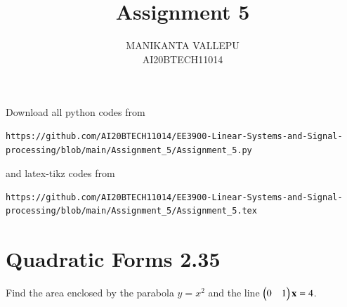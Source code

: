\documentclass[journal,12pt,twocolumn]{IEEEtran}
\begin{document}
     \def\centbox#1{\makebox[0in]{#1}}
     \def\topbox#1{\raisebox{-\baselineskip}[0in][0in]{#1}}
     \def\midbox#1{\raisebox{-0.5\baselineskip}[0in][0in]{#1}}
\vspace{3cm}
\title{Assignment 5}
\author{MANIKANTA VALLEPU \\ AI20BTECH11014}
\maketitle
\newpage
\bigskip
\renewcommand{\thefigure}{\theenumi}
\renewcommand{\thetable}{\theenumi}
Download all python codes from 
\begin{lstlisting}
https://github.com/AI20BTECH11014/EE3900-Linear-Systems-and-Signal-processing/blob/main/Assignment_5/Assignment_5.py
\end{lstlisting}
%
and latex-tikz codes from 
%
\begin{lstlisting}
https://github.com/AI20BTECH11014/EE3900-Linear-Systems-and-Signal-processing/blob/main/Assignment_5/Assignment_5.tex
\end{lstlisting}
\section{Quadratic Forms 2.35}
Find the area enclosed by the parabola $y = x^2$ and the line $\begin{pmatrix}0& 1\end{pmatrix}\mathbf{x} = 4$.
\end{document}
